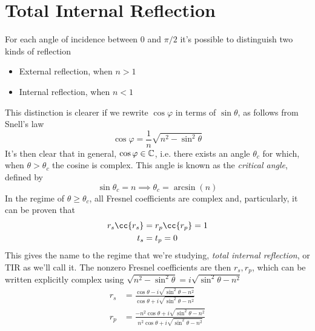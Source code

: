 \documentclass[../electromagnetism.tex]{subfiles}
\begin{document}
\section{Total Internal Reflection}
For each angle of incidence between $0$ and $\pi/2$ it's possible to distinguish two kinds of reflection
\begin{itemize}
\item External reflection, when $n>1$
\item Internal reflection, when $n<1$
\end{itemize}
This distinction is clearer if we rewrite $\cos\varphi$ in terms of $\sin\theta$, as follows from Snell's law
\begin{equation*}
	\cos\varphi=\frac{1}{n}\sqrt{n^2-\sin^2\theta}
\end{equation*}
It's then clear that in general, $\cos\varphi\in\operatorname{\mathbb{C}}$, i.e. there exists an angle $\theta_c$ for which, when $\theta>\theta_c$ the cosine is complex. This angle is known as the \textit{critical angle}, defined by
\begin{equation}
	\sin\theta_c=n\implies\theta_c=\arcsin(n)
	\label{eq:critang.tir}
\end{equation}
In the regime of $\theta\ge\theta_c$, all Fresnel coefficients are complex and, particularly, it can be proven that 
\begin{equation}
	\begin{aligned}
		r_s\cc{r_s}&=r_p\cc{r_p}=1\\
		t_s&= t_p=0
	\end{aligned}
	\label{eq:rt.tir}
\end{equation}
This gives the name to the regime that we're studying, \textit{total internal reflection}, or TIR as we'll call it. The nonzero Fresnel coefficients are then $r_s, r_p$, which can be written explicitly complex using $\sqrt{n^2-\sin^2\theta}=i\sqrt{\sin^2\theta-n^2}$
\begin{equation}
	\begin{aligned}
		r_s&= \frac{\cos\theta-i\sqrt{\sin^2\theta-n^2}}{\cos\theta+i\sqrt{\sin^2\theta-n^2}}\\
		r_p&= \frac{-n^2\cos\theta+i\sqrt{\sin^2\theta-n^2}}{n^2\cos\theta+i\sqrt{\sin^2\theta-n^2}}
	\end{aligned}
	\label{eq:rsrp.tir}
\end{equation}
\end{document}
